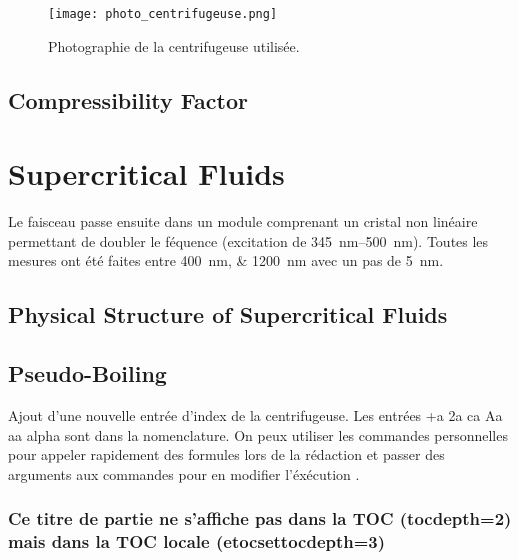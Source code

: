 			\begin{figure}[h!tbp]
				\vspace{0.5cm}
				\setcapindent{2em}
				\centering
				\texttt{[image: photo\_centrifugeuse.png]}
				\caption[Photographie de la centrifugeuse]{Photographie de la centrifugeuse utilisée.}
				\label{photo_centrifugeuse}
			\end{figure}

			\lipsum[2]

	\subsection{Compressibility Factor}

\section{Supercritical Fluids}

	Le faisceau passe ensuite dans un module comprenant un cristal non linéaire permettant de doubler le féquence (excitation de \SIrange{345}{500}{\nano\meter}). Toutes les mesures ont été faites entre \SIlist{400;1200}{\nano\meter} avec un pas de \SI{5}{\nano\meter}.
	
	\lipsum[3]

	\subsection{Physical Structure of Supercritical Fluids}

		\lipsum[4]

	\subsection{Pseudo-Boiling} %

		Ajout d'une nouvelle entrée d'index de la centrifugeuse. Les entrées \gls{+a} \gls{2a} \gls{ca} \gls{Aa} \gls{aa} \gls{alpha} {\NoAutoSpaceBeforeFDP}sont dans la nomenclature. On peux utiliser les commandes personnelles pour appeler rapidement des formules lors de la rédaction \acc et passer des arguments aux commandes pour en modifier l'éxécution \emiss[\nu]{\Omega}.
		
		\subsubsection{Ce titre de partie ne s'affiche pas dans la TOC (tocdepth=2) mais dans la TOC locale (etocsettocdepth=3)}

